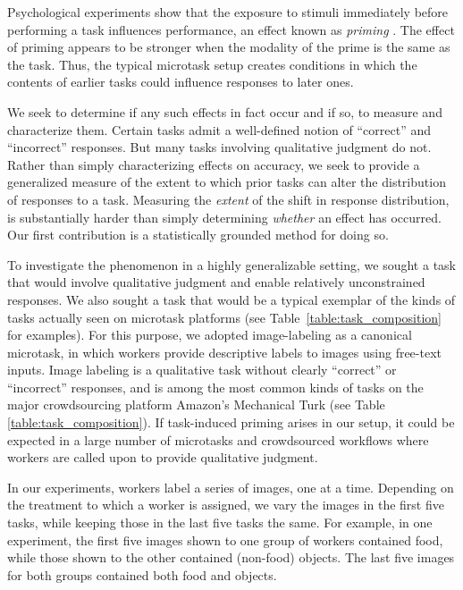 \documentclass{sigchi}
\begin{document}
Psychological experiments show that the exposure to stimuli immediately 
before performing a task influences performance, an effect known as 
\textit{priming} \cite{BJOP1796}.
The effect of priming appears to be stronger when the modality of the
prime is the same as the task.
Thus, the typical microtask setup creates conditions in which
the contents of earlier tasks could influence responses to later ones.

We seek to determine if any such effects in fact occur and if so, 
to measure and characterize them.
Certain tasks admit a well-defined notion of ``correct'' and 
``incorrect'' responses.  But many tasks involving qualitative judgment
do not.  Rather than simply characterizing effects on accuracy, we seek
to provide a generalized measure of the extent to which prior tasks
can alter the distribution of responses to a task.  
Measuring the \textit{extent} of the shift in response distribution, is 
substantially harder than simply determining \textit{whether} an effect 
has occurred.  Our first contribution is a statistically grounded method 
for doing so.

To investigate the phenomenon in a
highly generalizable setting, we sought a task that would involve 
qualitative judgment and enable relatively unconstrained responses. 
We also sought a task that would be a typical exemplar of the kinds of
tasks actually seen on microtask platforms (see 
Table~\ref{table:task_composition} for examples).  For this purpose, we 
adopted
image-labeling as a canonical microtask, in which workers provide 
descriptive labels to images using free-text inputs.  Image labeling is
a qualitative task without clearly ``correct'' or ``incorrect'' responses,
and is among the most common kinds of tasks on the major crowdsourcing
platform Amazon's Mechanical Turk (see Table \ref{table:task_composition}).
If task-induced priming arises in our 
setup, it could be expected in a large number of microtasks and 
crowdsourced workflows where workers are called upon to provide qualitative
judgment.

In our experiments, workers label a series of images, one at a time.
Depending on the treatment to which a worker is assigned, we vary the
images in the first five tasks, while keeping those in the last five tasks 
the same.  For example, in one experiment, the first five images shown to
one group of workers contained food, while those shown to the other 
contained (non-food) objects.  The last five images for both
groups contained both food and objects.
\end{document}
